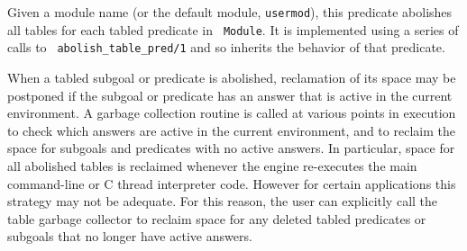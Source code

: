 \begin{description}
\begin{description}
{%



}
%
Given a module name (or the default module, {\tt usermod}), this
predicate abolishes all tables for each tabled predicate in {\tt
  Module}.  It is implemented using a series of calls to {\tt
  abolish\_table\_pred/1} and so inherits the behavior of that
predicate.


%
When a tabled subgoal or predicate is abolished, reclamation of its
space may be postponed if the subgoal or predicate has an answer that
is active in the current environment.  A garbage collection routine is
called at various points in execution to check which answers are
active in the current environment, and to reclaim the space for
subgoals and predicates with no active answers.  In particular, space
for all abolished tables is reclaimed whenever the engine re-executes
the main command-line or C thread interpreter code.  However for
certain applications this strategy may not be adequate.  For this
reason, the user can explicitly call the table garbage collector
to reclaim space for any deleted tabled predicates or subgoals that no
longer have active answers.


\end{description}
\end{description}
